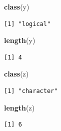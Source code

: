 \documentclass[
]{article}
\newenvironment{Shaded}{\begin{snugshade}}{\end{snugshade}}
\newcommand{\KeywordTok}[1]{\textcolor[rgb]{0.13,0.29,0.53}{\textbf{#1}}}
\newcommand{\NormalTok}[1]{#1}
\begin{document}
\begin{Shaded}
\begin{Highlighting}[]
\KeywordTok{class}\NormalTok{(y)}
\end{Highlighting}
\end{Shaded}

\begin{verbatim}
[1] "logical"
\end{verbatim}

\begin{Shaded}
\begin{Highlighting}[]
\KeywordTok{length}\NormalTok{(y)}
\end{Highlighting}
\end{Shaded}

\begin{verbatim}
[1] 4
\end{verbatim}

\begin{Shaded}
\begin{Highlighting}[]
\KeywordTok{class}\NormalTok{(z)}
\end{Highlighting}
\end{Shaded}

\begin{verbatim}
[1] "character"
\end{verbatim}

\begin{Shaded}
\begin{Highlighting}[]
\KeywordTok{length}\NormalTok{(z)}
\end{Highlighting}
\end{Shaded}

\begin{verbatim}
[1] 6
\end{verbatim}
\end{document}
